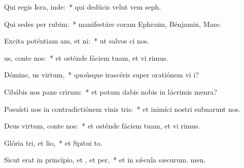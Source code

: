 \item Qui regis Isra, inde:~* qui dedúcis velut vem seph.
\item Qui sedes per rubim:~* manifestáre coram Ephraim, Bénjamin,  Mase.
\item Excita poténtiam am, et ni:~* ut salvos ci nos.
\item {}us, conte nos:~* et osténde fáciem tuam, et vi rimus.
\item Dómine, us virtum,~* quoúsque irascéris super oratiónem vi i?
\item Cibábis nos pane crirum:~* et potum dabis nobis in lácrimis  menra?
\item Posuísti nos in contradictiónem vinis tris:~* et inimíci nostri subnarunt nos.
\item Deus virtum, conte nos:~* et osténde fáciem tuam, et vi rimus.
\item Glória tri, et lio,~* et Spitui to.
\item Sicut erat in princípio, et , et per,~* et in sǽcula sæcurum. men.
